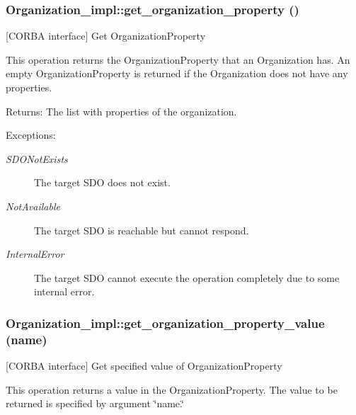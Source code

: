\subsubsection{\setlength{\rightskip}{0pt plus 5cm}Organization\_\-impl::get\_\-organization\_\-property ()}\label{classOrganization__impl_Organization__impla1}


[CORBA interface] Get Organization\-Property 

This operation returns the Organization\-Property that an Organization has. An empty Organization\-Property is returned if the Organization does not have any properties.

\begin{Desc}
\item[Returns:]The list with properties of the organization. \end{Desc}
\begin{Desc}
\item[Exceptions:]
\begin{description}
\item[{\em SDONot\-Exists}]The target SDO does not exist. \item[{\em Not\-Available}]The target SDO is reachable but cannot respond. \item[{\em Internal\-Error}]The target SDO cannot execute the operation completely due to some internal error.\end{description}
\end{Desc}
\subsubsection{\setlength{\rightskip}{0pt plus 5cm}Organization\_\-impl::get\_\-organization\_\-property\_\-value (name)}\label{classOrganization__impl_Organization__impla2}


[CORBA interface] Get specified value of Organization\-Property 

This operation returns a value in the Organization\-Property. The value to be returned is specified by argument \char`\"{}name.\char`\"{}

